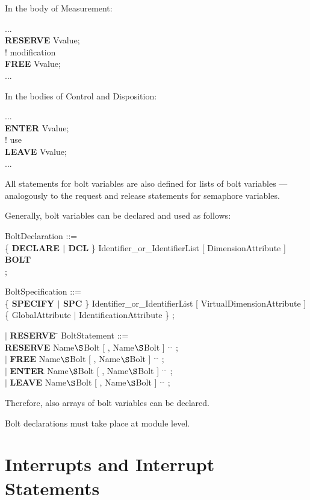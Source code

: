 \begin{tobedone}
In the body of Measurement:

...\\
{\bf RESERVE} Vvalue;\\
\x ! modification\\
{\bf FREE} Vvalue;\\
...

In the bodies of Control and Disposition:

...\\
{\bf ENTER} Vvalue;\\
\x ! use\\
{\bf LEAVE} Vvalue;\\
...

All statements for bolt variables are also defined for lists of bolt
variables --- analogously to the request and release statements for
semaphore variables.

Generally, bolt variables can be declared and used as follows:

BoltDeclaration ::=\\
\x \{ {\bf DECLARE $\mid$ DCL} \} Identifier\_or\_IdentifierList 
[ DimensionAttribute ] {\bf BOLT}\\
\x [ GlobalAttribute ] ;

BoltSpecification ::=\\
\x \{ {\bf SPECIFY $\mid$ SPC} \} Identifier\_or\_IdentifierList 
[ VirtualDimensionAttribute ]\\
\x {} \{ GlobalAttribute $\mid$ IdentificationAttribute \} ;

\begin{tabbing}
\x $\mid$ \= {\bf RESERVE} \= \kill
BoltStatement ::= \> \> \\
   \> {\bf RESERVE} \> Name$\S $Bolt [ , Name$\S $Bolt ] $^{...}$ ;\\
\x $\mid$ \> {\bf FREE}    \> Name$\S $Bolt [ , Name$\S $Bolt ] $^{...}$ ;\\
\x $\mid$ \> {\bf ENTER}   \> Name$\S $Bolt [ , Name$\S $Bolt ] $^{...}$ ;\\
\x $\mid$ \> {\bf LEAVE}   \> Name$\S $Bolt [ , Name$\S $Bolt ] $^{...}$ ;
\end{tabbing}

Therefore, also arrays of bolt variables can be declared.

Bolt declarations must take place at module level.
\end{tobedone}


\section{Interrupts and Interrupt Statements}   %

